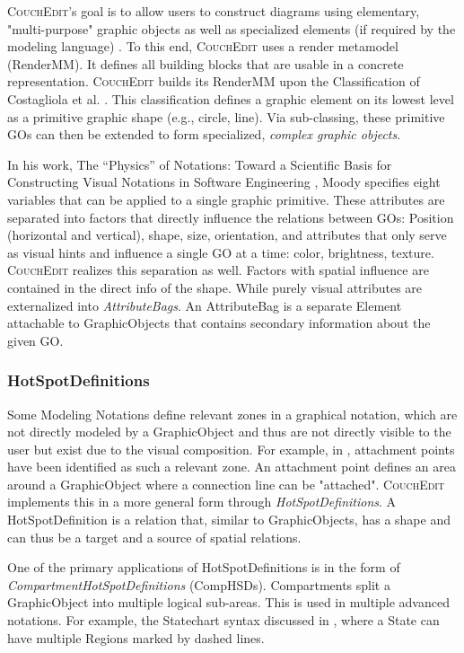 \textsc{CouchEdit}'s goal is to allow users to construct diagrams using elementary, "multi-purpose" graphic objects as well as specialized elements (if required by the modeling language) \cite{nachreiner_couchedit_2020}. To this end, \textsc{CouchEdit} uses a render metamodel (RenderMM). It defines all building blocks that are usable in a concrete representation. \textsc{CouchEdit} builds its RenderMM upon the Classification of Costagliola et al. \cite{costagliola_classification_2002}. This classification defines a graphic element on its lowest level as a primitive graphic shape (e.g., circle, line). Via sub-classing, these primitive GOs can then be extended to form specialized, \emph{complex graphic objects}.

In his work, The “Physics” of Notations: Toward a Scientific Basis for Constructing Visual Notations in Software Engineering \cite{moody_physics_2009}, Moody specifies eight variables that can be applied to a single graphic primitive. These attributes are separated into factors that directly influence the relations between GOs:  Position (horizontal and vertical), shape, size, orientation, and attributes that only serve as visual hints and influence a single GO at a time: color, brightness, texture. \textsc{CouchEdit} realizes this separation as well. Factors with spatial influence are contained in the direct info of the shape. While purely visual attributes are externalized into \emph{AttributeBags}. An AttributeBag is a separate Element attachable to GraphicObjects that contains secondary information about the given GO.

\subsubsection{HotSpotDefinitions}
\label{sec:hotspotdefinitions}
Some Modeling Notations define relevant zones in a graphical notation, which are not directly modeled by a GraphicObject and thus are not directly visible to the user but exist due to the visual composition. For example, in \cite{bottoni_suite_2004}, attachment points have been identified as such a relevant zone. An attachment point defines an area around a GraphicObject where a connection line can be "attached". \textsc{CouchEdit} implements this in a more general form through \emph{HotSpotDefinitions}. A HotSpotDefinition is a relation that, similar to GraphicObjects, has a shape and can thus be a target and a source of spatial relations.

One of the primary applications of HotSpotDefinitions is in the form of \emph{CompartmentHotSpotDefinitions} (CompHSDs). Compartments split a GraphicObject into multiple logical sub-areas. This is used in multiple advanced notations. For example, the Statechart syntax discussed in , where a State can have multiple Regions marked by dashed lines. 

